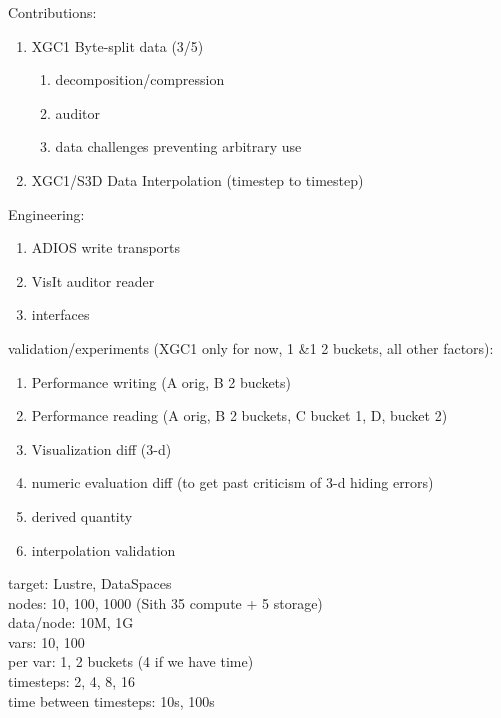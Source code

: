 \documentclass{sig-alt-gov2}
\begin{document}

Contributions:\\
\begin{enumerate}
\item XGC1 Byte-split data (3/5)
  \begin{enumerate}
  \item decomposition/compression
  \item auditor
  \item data challenges preventing arbitrary use
  \end{enumerate}
\item XGC1/S3D Data Interpolation (timestep to timestep)
\end{enumerate}

Engineering:\\
\begin{enumerate}
\item ADIOS write transports
\item VisIt auditor reader
\item interfaces
\end{enumerate}

validation/experiments (XGC1 only for now, 1 \&1 2 buckets, all other factors):\\
\begin{enumerate}
\item Performance writing (A orig, B 2 buckets)
\item Performance reading (A orig, B 2 buckets, C bucket 1, D, bucket 2)
\item Visualization diff (3-d)
\item numeric evaluation diff (to get past criticism of 3-d hiding errors)
\item derived quantity
\item interpolation validation
\end{enumerate}

target: Lustre, DataSpaces\\
nodes: 10, 100, 1000 (Sith 35 compute + 5 storage)\\
data/node: 10M, 1G\\
vars: 10, 100\\
per var: 1, 2 buckets (4 if we have time)\\
timesteps: 2, 4, 8, 16\\
time between timesteps: 10s, 100s\\
\end{document}
